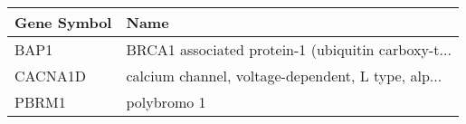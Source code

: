 \begin{tabular}{ll}
\toprule
Gene Symbol &                                               Name \\
\midrule
       BAP1 & BRCA1 associated protein-1 (ubiquitin carboxy-t... \\
    CACNA1D & calcium channel, voltage-dependent, L type, alp... \\
      PBRM1 &                                        polybromo 1 \\
\bottomrule
\end{tabular}
